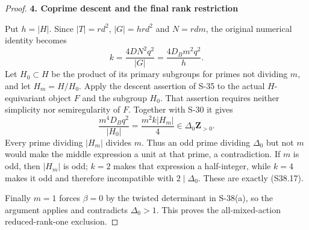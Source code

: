 \begin{proof}
\par

\medskip\noindent\textbf{4. Coprime descent and the final rank restriction}\quad

Put \(h=|H|\). Since \(|T|=rd^2\), \(|G|=hrd^2\) and \(N=rdm\), the original numerical identity becomes \[
 k=\frac{4DN^2q^2}{|G|}
   =\frac{4D_Bm^2q^2}{h}.
 \tag{S38.24}
\] Let \(H_0\subset H\) be the product of its primary subgroups for primes not dividing \(m\), and let \(H_m=H/H_0\). Apply the descent assertion of S-35 to the actual \(H\)-equivariant object \(F\) and the subgroup \(H_0\). That assertion requires neither simplicity nor semiregularity of \(F\). Together with S-30 it gives \[
 \frac{m^4D_Bq^2}{|H_0|}
   =\frac{m^2 k |H_m|}{4}
   \in\Delta_0\mathbf Z_{>0}.
 \tag{S38.25}
\] Every prime dividing \(|H_m|\) divides \(m\). Thus an odd prime dividing \(\Delta_0\) but not \(m\) would make the middle expression a unit at that prime, a contradiction. If \(m\) is odd, then \(|H_m|\) is odd; \(k=2\) makes that expression a half-integer, while \(k=4\) makes it odd and therefore incompatible with \(2\mid\Delta_0\). These are exactly (S38.17).

Finally \(m=1\) forces \(\beta=0\) by the twisted determinant in S-38(a), so the argument applies and contradicts \(\Delta_0>1\). This proves the all-mixed-action reduced-rank-one exclusion.
\end{proof}

